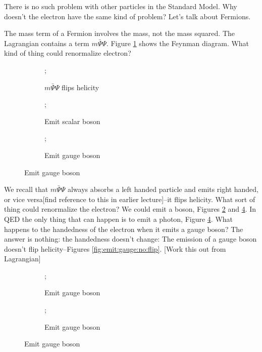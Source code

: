 \documentclass[]{article}
\begin{document}
There is no such problem with other particles in the Standard Model. Why doesn't the electron have the same kind of problem? Let's talk about Fermions.

The mass term of a Fermion involves the mass, not the mass squared. The Lagrangian contains a term $m \bar{\Psi} \Psi$. Figure \ref{fig:Fermion:feynman} shows the Feynman diagram. What kind of thing could renormalize electron?

\begin{figure}[H]
	\begin{center}
		\caption{Feynman diagram for $m \bar{\Psi} \Psi$}
		\begin{subfigure}[t]{0.3\textwidth}
			\caption{$m \bar{\Psi} \Psi$ flips helicity}\label{fig:Fermion:feynman}
			;
		\end{subfigure}
		\begin{subfigure}[t]{0.3\textwidth}
				\caption{Emit scalar boson}\label{fig:emit:scalar}
				;
		\end{subfigure}
		\begin{subfigure}[t]{0.3\textwidth}
			\caption{Emit gauge boson}\label{fig:emit:gauge}
			;
		\end{subfigure}
	\end{center}
\end{figure}

We recall that $m \bar{\Psi} \Psi$ always absorbs a left handed particle and emits right handed, or vice versa[find reference to this in earlier lecture]--it flips helicity. What sort of thing could renormalize the electron? We could emit a boson, Figures \ref{fig:emit:scalar} and \ref{fig:emit:gauge}. In QED the only thing that can happen is to emit a photon, Figure \ref{fig:emit:gauge}. What happens to the handedness of the electron when it emits a gauge boson? The answer is nothing: the handedness doesn't change: The emission of a gauge boson doesn't flip helicity--Figures \ref{fig:emit:gauge:no:flip}.
[Work this out from Lagrangian]
\begin{figure}[H]
	\begin{center}
		\caption{Emission of a gauge boson doesn't flip helicity}\label{fig:emit:gauge:no:flip}
		\begin{subfigure}[t]{0.3\textwidth}
			\caption{Emit gauge boson}\label{fig:emit:gauge:LL}
			;
		\end{subfigure}
		\begin{subfigure}[t]{0.3\textwidth}
			\caption{Emit gauge boson}\label{fig:emit:gauge:RR}
			;
		\end{subfigure}
	\end{center}
\end{figure}
\end{document}
